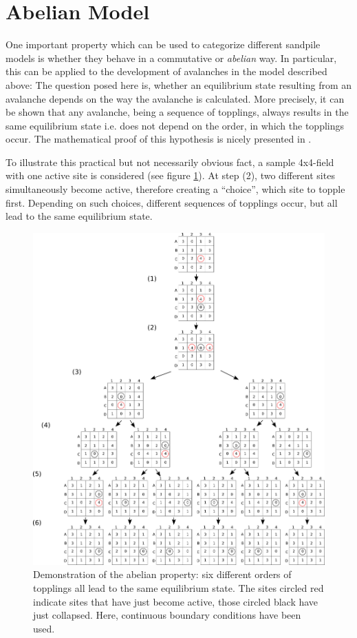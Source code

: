 \section{Abelian Model}
One important property which can be used to categorize different sandpile models is whether they behave in a commutative or \emph{abelian} way. In particular, this can be applied to the development of avalanches in the model described above: The question posed here is, whether an equilibrium state resulting from an avalanche depends on the way the avalanche is calculated. More precisely, it can be shown that any avalanche, being a sequence of topplings, always results in the same equilibrium state i.e. does not depend on the order, in which the topplings occur. The mathematical proof of this hypothesis is nicely presented in \cite{sandpile_math}.

To illustrate this practical but not necessarily obvious fact, a sample 4x4-field with one active site is considered (see figure \ref{pics:abelian}). At step (2), two different sites simultaneously become active, therefore creating a ``choice'', which site to topple first. Depending on such choices, different sequences of topplings occur, but all lead to the same equilibrium state.

\begin{figure}[!htpb]
\centering
\includegraphics[width=\textwidth]{pics/pic1_abelian.pdf}
\caption[]{Demonstration of the abelian property: six different orders of topplings all lead to the same equilibrium state. The sites circled red indicate sites that have just become active, those circled black have just collapsed. Here, continuous boundary conditions have been used.}
\label{pics:abelian}
\end{figure}
